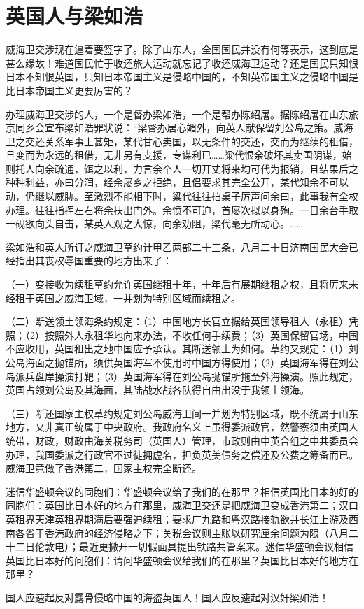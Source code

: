 \section{英国人与梁如浩}


威海卫交涉现在逼着要签字了。除了山东人，全国国民并没有何等表示，这到底是甚么缘故！难道国民忙于收还旅大运动就忘记了收还威海卫运动？还是国民只知恨日本不知恨英国，只知日本帝国主义是侵略中国的，不知英帝国主义之侵略中国是比日本帝国主义更要厉害的？

办理威海卫交涉的人，一个是督办梁如浩，一个是帮办陈绍屠。据陈绍屠在山东旅京同乡会宣布梁如浩罪状说：“梁督办居心媚外，向英人献保留刘公岛之策。威海卫之交还关系军事上甚矩，某代甘心卖国，以无条件的交还，交而为继续的租借，旦变而为永远的租借，无非另有支援，专谋利已……粱代恨余破坏其卖国阴谋，始则托人向余疏通，饵之以利，力言余个人一切开丈将来均可代为报销，且结果后之种种利益，亦曰分润，经余屡乡之拒绝，且侣要求其完全公开，某代知余不可以动，仍继以威胁。至激烈不能相下时，粱代往往拍桌子厉声问余曰，此事我有全权办理。往往指挥左右将余扶出门外。余愤不可迫，首屡次拟以身殉。一日余台手取一砚欲向头自击，某英人观之大惊，向余劝阻，梁代毫无所动心。……

梁如浩和英人所订之威海卫草约计甲乙两部二十三条，八月二十日济南国民大会已经指出其丧权辱国重要的地方出来了：

（一）变接收为续租草约允许英国继租十年，十年后有展期继租之权，且将厉来未经租于英国之威海卫域，一并划为特别区域而续租之。

（二）断送领土领海条约规定：（1）中国地方长官立据给英国领导租人（永租）凭照；（2）按照外人永租华地向来办法，不收任何手续费；（3）英国保留官场，中国不应收用，英国租出之地中国应予承认。其断送领土为如何。草约又规定：（1）刘公岛海面之抛锚所，须供英国海军不使用时中国方得使用；（2）英国海军得在刘公岛派兵盘岸操演打靶；（3）英国海军得在刘公岛抛锚所拖至外海操演。照此规定，英国占领刘公岛及其海面，其陆战水战各队得自由出没于我领土领海。

（三）断还国家主权草约规定刘公岛威海卫间一并划为特别区域，既不统属于山东地方，又非真正统属于中央政府。我政府名义上虽得委派政官，然警察须由英国人统带，财政，财政由海关税务司（英国人）管理，市政则由中英合组之中共委员会办理，我国委派之行政官不过徒拥虚名，担负英美债务之偿还及公费之筹备而已。威海卫竟做了香港第二，国家主权完全断还。

迷信华盛顿会议的同胞们：华盛顿会议给了我们的在那里？相信英国比日本的好的同胞们：英国比日本好的地方在那里，威海卫交还是把威海卫变成香港第二；汉口英租界天津英租界期满后要强迫续租；要求广九路和粤汉路接轨欲并长江上游及西南各省于香港政府的经济侵略之下；关税会议则主账以研究厘余问题为限（八月二十二日伦敦电）；最近更撇开一切假面具提出铁路共管案来。迷信华盛顿会议相信英国比日本好的问胞们：请问华盛顿会议给我们的在那里？英国比日本好的地方在那里？

国人应速起反对露骨侵略中国的海盗英国人！国人应反速起对汉奸梁如浩！

